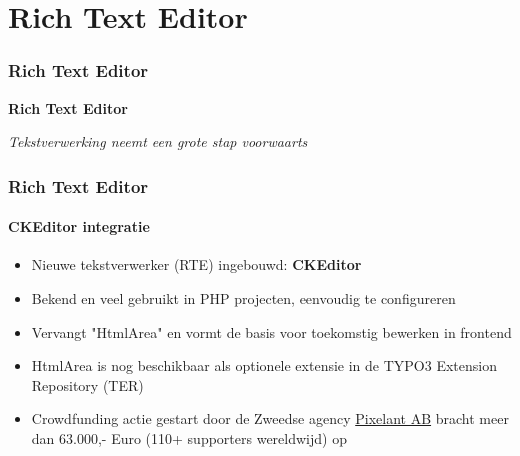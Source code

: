 %

\section{Rich Text Editor}
\begin{frame}[fragile]
	\frametitle{Rich Text Editor}

	\begin{center}\huge{\color{typo3darkgrey}\textbf{Rich Text Editor}}\end{center}
	\begin{center}\large{\textit{Tekstverwerking neemt een grote stap voorwaarts}}\end{center}

\end{frame}

\begin{frame}[fragile]
	\frametitle{Rich Text Editor}
	\framesubtitle{CKEditor integratie}

	\begin{itemize}

		\item Nieuwe tekstverwerker (RTE) ingebouwd: \textbf{CKEditor}
		\item Bekend en veel gebruikt in PHP projecten, eenvoudig te configureren
		\item Vervangt "HtmlArea" en vormt de basis voor toekomstig bewerken in frontend
		\item HtmlArea is nog beschikbaar als optionele extensie in de TYPO3 Extension Repository (TER)

		\item Crowdfunding actie gestart door de Zweedse agency
			\href{http://pixelant.net}{Pixelant AB} bracht meer dan
			63.000,- Euro (110+ supporters wereldwijd) op

	\end{itemize}

\end{frame}

